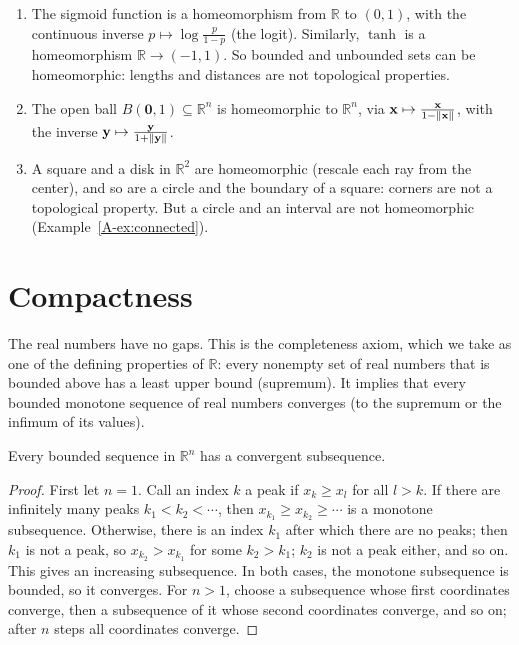 \begin{example}\label{A-ex:homeomorphisms}
    \begin{enumerate}
        \item The sigmoid function is a homeomorphism from $\mathbb{R}$ to $(0, 1)$, with the continuous inverse $p \mapsto \log\frac{p}{1 - p}$ (the logit). Similarly, $\tanh$ is a homeomorphism $\mathbb{R} \to (-1, 1)$. So bounded and unbounded sets can be homeomorphic: lengths and distances are not topological properties.
        \item The open ball $B(\mathbf{0}, 1) \subseteq \mathbb{R}^n$ is homeomorphic to $\mathbb{R}^n$, via $\mathbf{x} \mapsto \frac{\mathbf{x}}{1 - \lVert \mathbf{x} \rVert}$, with the inverse $\mathbf{y} \mapsto \frac{\mathbf{y}}{1 + \lVert \mathbf{y} \rVert}$.
        \item A square and a disk in $\mathbb{R}^2$ are homeomorphic (rescale each ray from the center), and so are a circle and the boundary of a square: corners are not a topological property. But a circle and an interval are not homeomorphic (Example~\ref{A-ex:connected}).
    \end{enumerate}
\end{example}

\section{Compactness}\label{A-sec:compact}

The real numbers have no gaps. This is the completeness axiom, which we take as one of the defining properties of $\mathbb{R}$: every nonempty set of real numbers that is bounded above has a least upper bound (supremum). It implies that every bounded monotone sequence of real numbers converges (to the supremum or the infimum of its values).

\begin{theorem}\label{A-thm:bolzano}
    Every bounded sequence in $\mathbb{R}^n$ has a convergent subsequence.
\end{theorem}

\begin{proof}
    First let $n = 1$. Call an index $k$ a peak if $x_k \geq x_l$ for all $l > k$. If there are infinitely many peaks $k_1 < k_2 < \cdots$, then $x_{k_1} \geq x_{k_2} \geq \cdots$ is a monotone subsequence. Otherwise, there is an index $k_1$ after which there are no peaks; then $k_1$ is not a peak, so $x_{k_2} > x_{k_1}$ for some $k_2 > k_1$; $k_2$ is not a peak either, and so on. This gives an increasing subsequence. In both cases, the monotone subsequence is bounded, so it converges. For $n > 1$, choose a subsequence whose first coordinates converge, then a subsequence of it whose second coordinates converge, and so on; after $n$ steps all coordinates converge.
\end{proof}

